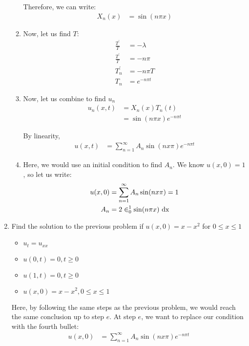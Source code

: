 \documentclass{article}
\begin{document}
\begin{enumerate}
\begin{enumerate}
  Therefore, we can write:
  \begin{align}
    X_n(x) & = \sin(n \pi x)
  \end{align}

  \item Now, let us find $T$:
  \begin{align}
    \frac{T^\prime}{T} & = -\lambda\\
    \frac{T^\prime}{T} & = - n \pi\\
    T^\prime_n & = - n \pi T\\
    T_n & = e^{-n \pi t}
  \end{align}

  \item Now, let us combine to find $u_n$
  \begin{align}
    u_n(x, t) & = X_n(x)T_n(t)\\
    & = \sin(n \pi x) e^{-n \pi t}
  \end{align}

  By linearity,
  \begin{align}
    u(x, t) & =
    \sum^\infty_{n = 1}
    A_n
    \sin(n x \pi)
    e^{-n \pi t}
  \end{align}
  \item Here, we would use an initial condition to find $A_n$. We know $u(x, 0) = 1$, so let us write:
  \begin{align}
    u(x, 0) & =
    \sum^\infty_{n = 1}
    A_n
    \sin(n x \pi)
    = 1\\
    A_n & = 2 \in^1_0 \sin(n \pi x) \text{ dx }
  \end{align}
\end{enumerate}
%
%
\item Find the solution to the previous problem if $u(x, 0) = x - x^2$ for $0 \leq x \leq 1$

\begin{itemize}
  \item $u_t = u_{xx}$
  \item $u(0, t) = 0, t \geq 0$
  \item $u(1, t) = 0, t \geq 0$
  \item $u(x, 0) = x - x^2, 0 \leq x \leq 1$
\end{itemize}

Here, by following the same steps as the previous problem, we would reach the same conclusion up to step $e$. At step $e$, we want to replace our condition with the fourth bullet:
%
\begin{align}
  u(x, 0) & = \sum^\infty_{n = 1} A_n \sin(n x \pi)e^{-n \pi t}
\end{align}


\end{enumerate}
\end{document}
